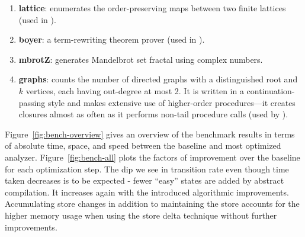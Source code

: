 \documentclass[preprint,onecolumn,9pt]{sigplanconf} %
\begin{document}
\begin{enumerate}
\item {\bf lattice}: enumerates the order-preserving maps between two
  finite lattices (used in
  \cite{dvanhorn:wright-jagannathan-toplas98,dvanhorn:jagannathan-etal-popl98}).

\item {\bf boyer}: a term-rewriting theorem prover (used in
  \cite{dvanhorn:wright-jagannathan-toplas98,dvanhorn:jagannathan-etal-popl98}).

\item {\bf mbrotZ}: generates Mandelbrot set fractal using complex
  numbers.

\item {\bf graphs}: counts the number of directed graphs with a
  distinguished root and \(k\) vertices, each having out-degree at
  most 2. It is written in a continuation-passing style and makes
  extensive use of higher-order procedures---it creates closures
  almost as often as it performs non-tail procedure calls (used by
  \cite{dvanhorn:wright-jagannathan-toplas98,dvanhorn:jagannathan-etal-popl98}).
\end{enumerate}


Figure~\ref{fig:bench-overview} gives an overview of the benchmark
results in terms of absolute time, space, and speed between the
baseline and most optimized analyzer.  Figure~\ref{fig:bench-all}
plots the factors of improvement over the baseline for each
optimization step. The dip we see in transition rate even though time
taken decreases is to be expected - fewer ``easy'' states are added by
abstract compilation. It increases again with the introduced
algorithmic improvements. Accumulating store changes in addition to
maintaining the store accounts for the higher memory usage when using
the store delta technique without further improvements.
\end{document}

